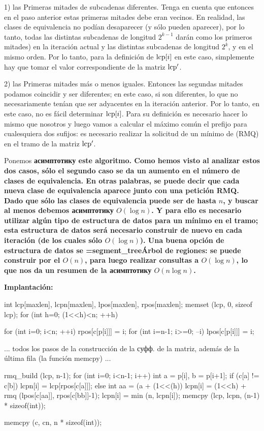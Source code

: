 1) las Primeras mitades de subcadenas diferentes. Tenga en cuenta que entonces en el paso anterior estas primeras mitades debe eran vecinos. En realidad, las clases de equivalencia no podían desaparecer (y sólo pueden aparecer), por lo tanto, todas las distintas subcadenas de longitud $2^{k-1}$ darán como los primeros mitades) en la iteración actual y las distintas subcadenas de longitud $2^k$, y en el mismo orden. Por lo tanto, para la definición de ${\rm lcp}[i]$ en este caso, simplemente hay que tomar el valor correspondiente de la matriz $\rm lcp^\prime$.

2) las Primeras mitades más o menos iguales. Entonces las segundas mitades podamos coincidir y ser diferentes; en este caso, si son diferentes, lo que no necesariamente tenían que ser adyacentes en la iteración anterior. Por lo tanto, en este caso, no es fácil determinar ${\rm lcp}[i]$. Para su definición es necesario hacer lo mismo que nosotros y luego vamos a calcular el máximo común el prefijo para cualesquiera dos sufijos: es necesario realizar la solicitud de un mínimo de (RMQ) en el tramo de la matriz $\rm lcp^\prime$.

Ponemos \bf{асимптотику} este algoritmo. Como hemos visto al analizar estos dos casos, sólo el segundo caso se da un aumento en el número de clases de equivalencia. En otras palabras, se puede decir que cada nueva clase de equivalencia aparece junto con una petición RMQ. Dado que sólo las clases de equivalencia puede ser de hasta $n$, y buscar al menos debemos асимптотику $O(\log n)$. Y para ello es necesario utilizar algún tipo de estructura de datos para un mínimo en el tramo; esta estructura de datos será necesario construir de nuevo en cada iteración (de los cuales sólo $O(\log n)$). Una buena opción de estructura de datos se \bf{\algohref=segment_tree{Árbol de regiones}}: se puede construir por el $O(n)$, para luego realizar consultas a $O(\log n)$, lo que nos da un resumen de la асимптотику $O(n \log n)$.

\bf{Implantación:}

\code
int lcp[maxlen], lcpn[maxlen], lpos[maxlen], rpos[maxlen];
memset (lcp, 0, sizeof lcp);
for (int h=0; (1<<h)<n; ++h) {
for (int i=0; i<n; ++i)
rpos[c[p[i]]] = i;
for (int i=n-1; i>=0; --i)
lpos[c[p[i]]] = i;

... todos los pasos de la construcción de la суфф. de la matriz, además de la última fila (la función memcpy) ...

rmq_build (lcp, n-1);
for (int i=0; i<n-1; i++) {
int a = p[i], b = p[i+1];
if (c[a] != c[b])
lcpn[i] = lcp[rpos[c[a]]];
else {
int aa = (a + (1<<(h)) %
lcpn[i] = (1<<h) + rmq (lpos[c[aa]], rpos[c[bb]]-1);
lcpn[i] = min (n, lcpn[i]);
}
}
memcpy (lcp, lcpn, (n-1) * sizeof(int));

memcpy (c, cn, n * sizeof(int));
}
\endcode

